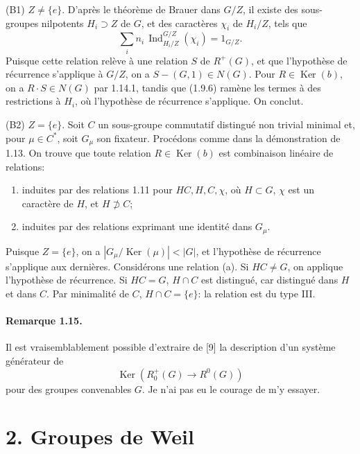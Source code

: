 \documentclass[10pt]{article}
\newcommand{\Ind}{\operatorname{Ind}}
\providecommand{\Ker}{\operatorname{Ker}}
\begin{document}
(B1) \(Z\ne\{e\}\). D'après le théorème de Brauer dans \(G/Z\), il existe des sous-groupes nilpotents \(H_i\supset Z\) de \(G\), et des caractères \(\chi_i\) de \(H_i/Z\), tels que
\[
\sum_i n_i\,\Ind_{H_i/Z}^{G/Z}(\chi_i)=1_{G/Z}.
\]
Puisque cette relation relève à une relation \(S\) de \(R^+(G)\), et que l'hypothèse de récurrence s'applique à \(G/Z\), on a \(S-(G,1)\in N(G)\). Pour \(R\in\Ker(b)\), on a \(R\cdot S\in N(G)\) par 1.14.1, tandis que (1.9.6) ramène les termes à des restrictions à \(H_i\), où l'hypothèse de récurrence s'applique. On conclut.

(B2) \(Z=\{e\}\). Soit \(C\) un sous-groupe commutatif distingué non trivial minimal et, pour \(\mu\in C^*\), soit \(G_\mu\) son fixateur. Procédons comme dans la démonstration de 1.13. On trouve que toute relation \(R\in\Ker(b)\) est combinaison linéaire de relations:
\begin{enumerate}[label=(\alph*)]
\item induites par des relations 1.11 pour \(HC,H,C,\chi\), où \(H\subset G\), \(\chi\) est un caractère de \(H\), et \(H\not\supset C\);
\item induites par des relations exprimant une identité dans \(G_\mu\).
\end{enumerate}
Puisque \(Z=\{e\}\), on a \(|G_\mu/\Ker(\mu)|<|G|\), et l'hypothèse de récurrence s'applique aux dernières. Considérons une relation (a). Si \(HC\ne G\), on applique l'hypothèse de récurrence. Si \(HC=G\), \(H\cap C\) est distingué, car distingué dans \(H\) et dans \(C\). Par minimalité de \(C\), \(H\cap C=\{e\}\): la relation est du type III.

\paragraph{Remarque 1.15.} Il est vraisemblablement possible d'extraire de [9] la description d'un système générateur de
\[
\Ker(R^+_0(G)\longrightarrow R^0(G))
\]
pour des groupes convenables \(G\). Je n'ai pas eu le courage de m'y essayer.

\section*{2. Groupes de Weil}
\end{document}
